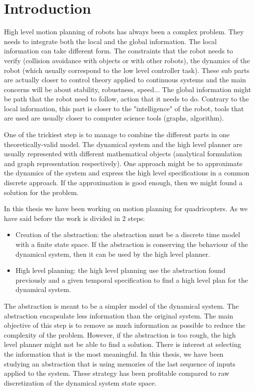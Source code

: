 \section*{Introduction}

High level motion planning of robots has always been a complex problem. They needs to integrate both the local and the global information.
The local information can take different form.
The constraints that the robot needs to verify (collision avoidance with objects or with other robots), the dynamics of the robot (which usually correspond to the low level controller task). These sub parts are actually closer to control theory applied to continuous systems and the main concerns will be about stability, robustness, speed...
The global information might be path that the robot need to follow, action that it needs to do. Contrary to the local information, this part is closer to the "intelligence" of the robot, tools that are used are usually closer to computer science tools (graphs, algorithm).

One of the trickiest step is to manage to combine the different parts in one theoretically-valid model.
The dynamical system and the high level planner are usually represented with different mathematical objects (analytical formulation and graph representation respectively).
One approach might be to approximate the dynamics of the 
system and express the high level specifications in a common discrete approach. If the approximation is good enough, then we might found a solution for the problem.

In this thesis we have been working on motion planning for quadricopters. As we have said before the work is divided in 2 steps:
\begin{itemize}
\item Creation of the abstraction: the abstraction must be a discrete time model with a finite state space. If the abstraction is conserving the behaviour of the dynamical system, then it can be used by the high level planner.
\item High level planning: the high level planning use the abstraction found previously and a given temporal specification to find a high level plan for the dynamical system.
\end{itemize}

The abstraction is meant to be a simpler model of the dynamical system. The abstraction encapsulate less information than the original system. The main objective of this step is to remove as much information as possible to reduce the complexity of the problem. However, if the abstraction is too rough, the high level planner might not be able to find a solution.
There is interest at selecting the information that is the most meaningful. In this thesis, we have been studying an abstraction that is using memories of the last sequence of inputs applied to the system. These strategy has been profitable compared to raw discretization of the dynamical system state space.


